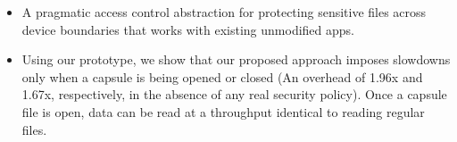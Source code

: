 \begin{itemize}

\item A pragmatic access control abstraction for protecting sensitive files
  across device boundaries that works with existing unmodified apps.

\item Using our prototype, we show that our proposed approach imposes slowdowns
  only when a capsule is being opened or closed (An overhead of 1.96x and 1.67x, respectively,
  in the absence of any real security policy). Once a capsule file is open, data can be read at a
  throughput identical to reading regular files.

\end{itemize}

\endinput

Any text after an \endinput is ignored.
You could put scraps here or things in progress.
